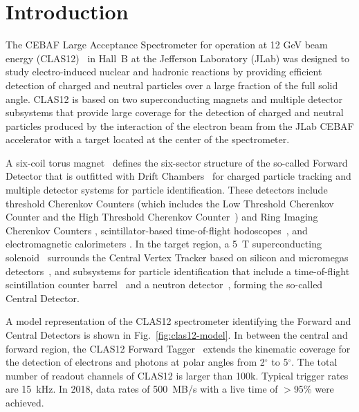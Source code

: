 \section{Introduction}

The CEBAF Large Acceptance Spectrometer for operation at 12 GeV beam energy (CLAS12)~\cite{clas12-nim} in
Hall~B at the Jefferson Laboratory (JLab) was designed to study electro-induced nuclear and hadronic reactions
by providing efficient detection of charged and neutral particles over a large fraction of the full solid angle. CLAS12
is based on two superconducting magnets and multiple detector subsystems that provide large coverage for the
detection of charged and neutral particles produced by the interaction of the electron beam from the JLab CEBAF
accelerator with a target located at the center of the spectrometer.

A six-coil torus magnet~\cite{magnets-nim} defines the six-sector structure of the so-called Forward Detector that
is outfitted with Drift Chambers~\cite{dc-nim} for charged particle tracking and multiple detector systems for
particle identification. These detectors include threshold Cherenkov Counters (which includes the Low Threshold
Cherenkov Counter and the High Threshold Cherenkov Counter~\cite{htcc-nim}) and Ring Imaging Cherenkov Counters
\cite{rich-nim}, scintillator-based time-of-flight hodoscopes~\cite{ftof-nim}, and electromagnetic calorimeters
\cite{ec-nim}. In the target region, a 5~T superconducting solenoid~\cite{magnets-nim} surrounds the Central Vertex
Tracker based on silicon and micromegas detectors~\cite{svt-nim,mm-nim}, and subsystems for particle identification
that include a time-of-flight scintillation counter barrel~\cite{ctof-nim} and a neutron detector~\cite{cnd-nim}, forming
the so-called Central Detector.

A model representation of the CLAS12 spectrometer identifying the Forward and Central Detectors is shown in
Fig.~\ref{fig:clas12-model}. In between the central and forward region, the CLAS12 Forward Tagger~\cite{ft-nim}
extends the kinematic coverage for the detection of electrons and photons at polar angles from 2$^\circ$ to 5$^\circ$.
The total number of readout channels of CLAS12 is larger than 100k. Typical trigger rates are 15~kHz. In 2018, data
rates of 500~MB/s with a live time of $>$95\% were achieved.

